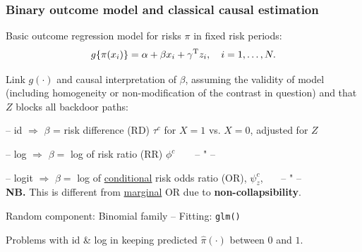 \documentclass[12pt,dvipsnames,t,aspectratio=169, handout%
]{beamer}
\begin{document}
\begin{frame}

\frametitle{\large Binary outcome model and classical causal estimation}

\bi
\item
Basic outcome regression model for risks $\pi$ in fixed risk periods: %
$$ g\{\pi(x_i)\} = \alpha + \beta x_i + \gamma^{\small\text{T}} z_i, \quad i = 1, \dots, N.$$
\item
Link $g(\cdot)$ and causal interpretation of $\beta$, assuming the
validity of model (including homogeneity or non-modification of the contrast in question)
and that $Z$ blocks all backdoor paths:   
\bi
{\normalsize 
\item[--]  id $\Rightarrow$ $\beta$ = 
risk difference (RD) $\tau^c$ for $X=1$ vs. $X=0$, adjusted for $Z$
\item[--] log $\Rightarrow$ $\beta =$ 
log of risk ratio (RR) $\phi^c$\ \ \ \ -- " --
\item[--] logit $\Rightarrow$ $\beta =$ 
log of \underline{conditional} risk odds ratio (OR),  $\psi_z^c$, \ \ \ -- " -- \\
{\bf NB.} This is different from \underline{marginal} OR due to \textbf{non-collapsibility}.
}
\ei
\item
Random component: Binomial family -- Fitting: \texttt{glm()}
\item
Problems with id \& log in keeping predicted $\widehat\pi(\cdot)$ between $0$ and $1$. 
\ei
\end{frame}
\end{document}
